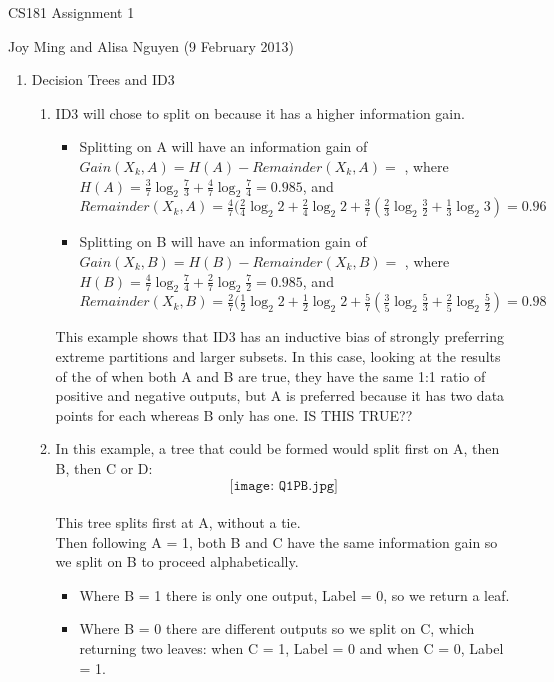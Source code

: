 \documentclass[11pt]{article}
\begin{document}
\begin{center}
\large
CS181 Assignment 1
\end{center}
Joy Ming and Alisa Nguyen (9 February 2013)\\

\begin{enumerate}
\setcounter{enumi}{0}

\item Decision Trees and ID3
\begin{enumerate}
\item ID3 will chose to split on  because it has a higher information gain.
	\begin{itemize}
	\item Splitting on A will have an information gain of $Gain(X_k,A)=H(A)-Remainder(X_k,A)=$ , 
		where $H(A) = \frac{3}{7}\log_2 \frac{7}{3} + \frac{4}{7}\log_2\frac{7}{4}=0.985$, %
		and $Remainder(X_k,A)=\frac{4}{7}(\frac{2}{4}\log_2 2+\frac{2}{4}\log_2 2+\frac{3}{7}(\frac{2}{3}\log_2 \frac{3}{2} + \frac{1}{3}\log_2 3) = 0.96$
	\item Splitting on B will have an information gain of $Gain(X_k,B)=H(B)-Remainder(X_k,B)=$ , 
		where $H(B) = \frac{4}{7}\log_2 \frac{7}{4} + \frac{2}{7}\log_2\frac{7}{2}=0.985$, %
		and $Remainder(X_k,B)=\frac{2}{7}(\frac{1}{2}\log_2 2+\frac{1}{2}\log_2 2+\frac{5}{7}(\frac{3}{5}\log_2 \frac{5}{3} + \frac{2}{5}\log_2 \frac{5}{2})=0.98$
	\end{itemize}
This example shows that ID3 has an inductive bias of strongly preferring extreme partitions and larger subsets. In this case, looking at the results of the of when both A and B are true, they have the same 1:1 ratio of positive and negative outputs, but A is preferred because it has two data points for each whereas B only has one. IS THIS TRUE??
\item In this example, a tree that could be formed would split first on A, then B, then C or D:\\
	$$\texttt{[image: Q1PB.jpg]}$$
	\\This tree splits first at A, without a tie.
	\\ Then following A = 1, both B and C have the same information gain so we split on B to proceed alphabetically. 
	\begin{itemize}
	\item Where B = 1 there is only one output, Label = 0, so we return a leaf.  
	\item Where B = 0 there are different outputs so we split on C, which returning two leaves: when C = 1, Label = 0 and when C = 0, Label = 1. 

\end{itemize}
\end{enumerate}
\end{enumerate}
\end{document}

